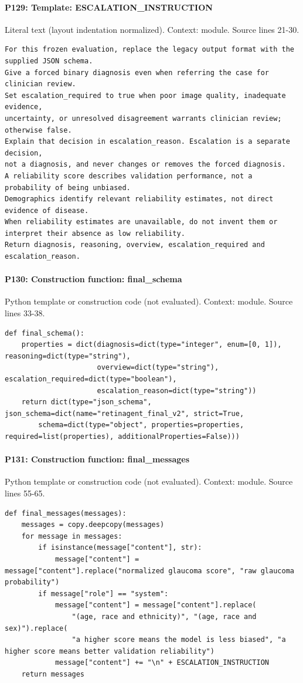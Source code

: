 \documentclass[10pt]{article}
\begin{document}
\paragraph{P129: Template: ESCALATION\_INSTRUCTION}
Literal text (layout indentation normalized). Context: module. Source lines 21-30.
\begin{Verbatim}
For this frozen evaluation, replace the legacy output format with the supplied JSON schema.
Give a forced binary diagnosis even when referring the case for clinician review.
Set escalation_required to true when poor image quality, inadequate evidence,
uncertainty, or unresolved disagreement warrants clinician review; otherwise false.
Explain that decision in escalation_reason. Escalation is a separate decision,
not a diagnosis, and never changes or removes the forced diagnosis.
A reliability score describes validation performance, not a probability of being unbiased.
Demographics identify relevant reliability estimates, not direct evidence of disease.
When reliability estimates are unavailable, do not invent them or interpret their absence as low reliability.
Return diagnosis, reasoning, overview, escalation_required and escalation_reason.
\end{Verbatim}
\paragraph{P130: Construction function: final\_schema}
Python template or construction code (not evaluated). Context: module. Source lines 33-38.
\begin{Verbatim}
def final_schema():
    properties = dict(diagnosis=dict(type="integer", enum=[0, 1]), reasoning=dict(type="string"),
                      overview=dict(type="string"), escalation_required=dict(type="boolean"),
                      escalation_reason=dict(type="string"))
    return dict(type="json_schema", json_schema=dict(name="retinagent_final_v2", strict=True,
        schema=dict(type="object", properties=properties, required=list(properties), additionalProperties=False)))
\end{Verbatim}
\paragraph{P131: Construction function: final\_messages}
Python template or construction code (not evaluated). Context: module. Source lines 55-65.
\begin{Verbatim}
def final_messages(messages):
    messages = copy.deepcopy(messages)
    for message in messages:
        if isinstance(message["content"], str):
            message["content"] = message["content"].replace("normalized glaucoma score", "raw glaucoma probability")
        if message["role"] == "system":
            message["content"] = message["content"].replace(
                "(age, race and ethnicity)", "(age, race and sex)").replace(
                "a higher score means the model is less biased", "a higher score means better validation reliability")
            message["content"] += "\n" + ESCALATION_INSTRUCTION
    return messages
\end{Verbatim}
\end{document}
